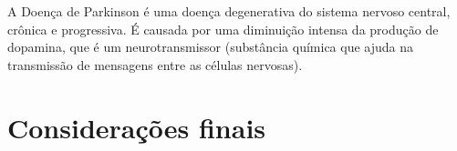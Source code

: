 \documentclass[
	article,			%
	12pt,				%
	oneside,			%
	a4paper,			%
	english,			%
	brazil,				%
	sumario=tradicional
	]{abntex2}
\begin{document}
\begin{itemize}
\end{itemize}

A Doença de Parkinson é uma doença degenerativa do sistema nervoso central, crônica e progressiva. É causada por uma diminuição intensa da produção de dopamina, que é um neurotransmissor (substância química que ajuda na transmissão de mensagens entre as células nervosas). 


% 
\section*{Considerações finais}


\postextual


\end{document}
